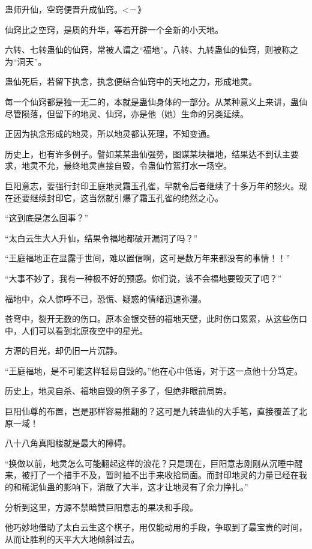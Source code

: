 
\begin{this_body}

蛊师升仙，空窍便晋升成仙窍。<－》

仙窍比之空窍，是质的升华，等若开辟一个全新的小天地。

六转、七转蛊仙的仙窍，常被人谓之“福地”。八转、九转蛊仙的仙窍，则被称之为“洞天”。

蛊仙死后，若留下执念，执念便结合仙窍中的天地之力，形成地灵。

每一个仙窍都是独一无二的，本就是蛊仙身体的一部分。从某种意义上来讲，蛊仙尽管陨落，但留下的地灵、仙窍，亦是他（她）生命的另类延续。

正因为执念形成的地灵，所以地灵都认死理，不知变通。

历史上，也有许多例子。譬如某某蛊仙强势，图谋某块福地，结果达不到认主要求，地灵不允，最终地灵直接自毁，令蛊仙竹篮打水一场空。

巨阳意志，要强行封印王庭地灵霜玉孔雀，早就令后者继续了十多万年的怒火。现在还要继续封印它，这当然就引爆了霜玉孔雀的绝然之心。

“这到底是怎么回事？”

“太白云生大人升仙，结果令福地都破开漏洞了吗？”

“王庭福地正在显露于世间，难以置信啊，这可是数万年来都没有的事情！！”

“大事不妙了，我有一种极不好的预感。你们说，该不会福地要毁灭了吧？”

福地中，众人惊呼不已，恐慌、疑惑的情绪迅速弥漫。

苍穹中，裂开无数的伤口。原本金银交替的福地天壁，此时伤口累累，从这些伤口中，人们可以看到北原夜空中的星光。

方源的目光，却仍旧一片沉静。

“王庭福地，是不可能这样轻易自毁的。”他在心中低语，对于这一点他十分笃定。

历史上，地灵自杀、福地自毁的例子多了，但绝非眼前局势。

巨阳仙尊的布置，岂是那样容易推翻的？这可是九转蛊仙的大手笔，直接覆盖了北原一域！

八十八角真阳楼就是最大的障碍。

“换做以前，地灵怎么可能翻起这样的浪花？只是现在，巨阳意志刚刚从沉睡中醒来，被打了一个措手不及，暂时抽不出手来收拾局面。而封印地灵的力量已经在我的和稀泥仙蛊的影响下，消散了大半，这才让地灵有了余力挣扎。”

分析到这里，方源不禁暗赞巨阳意志的果决和手段。

他巧妙地借助了太白云生这个棋子，用仅能动用的手段，争取到了最宝贵的时间，从而让胜利的天平大大地倾斜过去。


\end{this_body}
